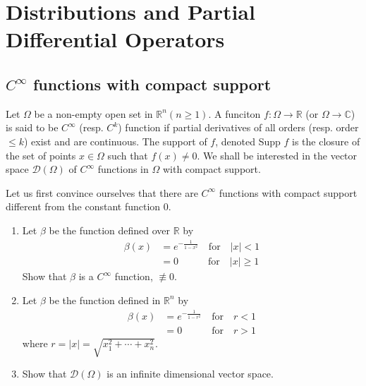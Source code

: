 \chapter{Distributions and Partial Differential Operators}\label{chap3}

\setcounter{pageoriginal}{0}
\section*{$C^{\infty}$ functions with compact support}\pageoriginale

Let $\Omega$ be a non-empty open set in $\mathbb{R}^{n}(n\geq 1)$. A funciton $f:\Omega\to \mathbb{R}$ (or $\Omega\to \mathbb{C}$) is said to be $C^{\infty}$ (resp. $C^{k}$) function if partial derivatives of all orders (resp. order $\leq k$) exist and are continuous. The support of $f$, denoted Supp $f$ is the closure of the set of points $x\in \Omega$ such that $f(x)\neq 0$. We shall be interested in the vector space $\mathcal{D}(\Omega)$ of $C^{\infty}$ functions in $\Omega$ with compact support.

Let us first convince ourselves that there are $C^{\infty}$ functions with compact support different from the constant function $0$.

\begin{exers*}
\begin{enumerate}
\renewcommand{\labelenumi}{(\theenumi)}
\item Let $\beta$ be the function defined over $\mathbb{R}$ by
\begin{align*}
\beta(x) &= e^{-\frac{1}{1-x^{2}}}\quad\text{for}\quad |x|<1\\[3pt]
 &= 0\qquad\quad\! \text{for}\quad |x|\geq 1
\end{align*}
Show that $\beta$ is a $C^{\infty}$ function, $\nequiv 0$.

\item Let $\beta$ be the function defined in $\mathbb{R}^{n}$ by
\begin{align*}
\beta(x) &= e^{-\frac{1}{1-r^{2}}}\quad\text{for}\quad r<1\\[3pt]
&= 0\qquad\quad\! \text{for}\quad r>1
\end{align*}
where $r=|x|=\sqrt{x^{2}_{1}+\cdots+x^{2}_{n}}$.

\item Show that $\mathcal{D}(\Omega)$ is an infinite dimensional vector space.
\end{enumerate}
\end{exers*}

